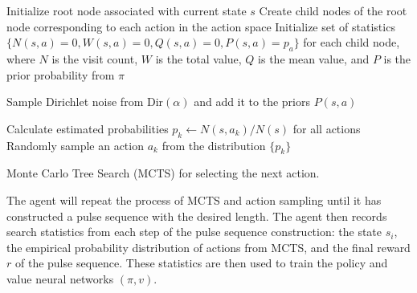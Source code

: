 \begin{algorithm}[H]
\BlankLine
Initialize root node associated with current state $s$ \;
Create child nodes of the root node corresponding to each action in the action space \;
Initialize set of statistics $\{ N(s,a)=0, W(s,a)=0, Q(s,a)=0, P(s,a)= p_a \}$ for each child node, where $N$ is the visit count, $W$ is the total value, $Q$ is the mean value, and $P$ is the prior probability from $\pi$ \;

Sample Dirichlet noise from $\text{Dir}(\alpha)$ and add it to the priors $P(s, a)$ \;

Calculate estimated probabilities $p_k \leftarrow N(s, a_k) / N(s)$ for all actions \;
Randomly sample an action $a_k$ from the distribution $\{ p_k \}$ \;

\caption{Monte Carlo Tree Search (MCTS) for selecting the next action. \label{al:mcts}}
\end{algorithm}










The agent will repeat the process of MCTS and action sampling until it has constructed a pulse sequence with the desired length. The agent then records search statistics from each step of the pulse sequence construction: the state $s_i$, the empirical probability distribution of actions from MCTS, and the final reward $r$ of the pulse sequence. These statistics are then used to train the policy and value neural networks $(\pi, v)$.


